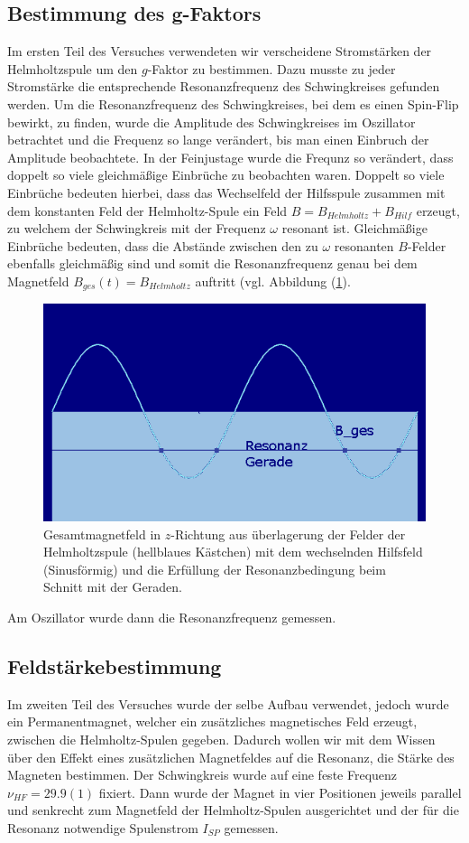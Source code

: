 \documentclass[a4paper,10pt]{scrartcl} %
\begin{document}
\subsection{Bestimmung des g-Faktors}
\label{subsec:g-Faktor}
Im ersten Teil des Versuches verwendeten wir verscheidene Stromstärken der Helmholtzspule um den $g$-Faktor zu bestimmen. Dazu musste zu jeder Stromstärke die entsprechende Resonanzfrequenz des Schwingkreises gefunden werden. Um die Resonanzfrequenz des Schwingkreises, bei dem es einen Spin-Flip bewirkt, zu finden, wurde die Amplitude des Schwingkreises im Oszillator betrachtet und die Frequenz so lange verändert, bis man einen Einbruch der Amplitude beobachtete. In der Feinjustage wurde die Frequnz so verändert, dass doppelt so viele gleichmä\ss ige Einbrüche zu beobachten waren. Doppelt so viele Einbrüche bedeuten hierbei, dass das Wechselfeld der Hilfsspule zusammen mit dem konstanten Feld der Helmholtz-Spule ein Feld $B = B_{Helmholtz} + B_{Hilf}$ erzeugt, zu welchem der Schwingkreis mit der Frequenz $\omega$ resonant ist. Gleichmä\ss ige Einbrüche bedeuten, dass die Abstände zwischen den zu $\omega$ resonanten $B$-Felder ebenfalls gleichmä\ss ig sind und somit die Resonanzfrequenz genau bei dem Magnetfeld $B_{ges}(t) = B_{Helmholtz}$ auftritt (vgl. Abbildung (\ref{fig:Resonanz}).
\begin{figure}
\label{fig:Resonanz}
\includegraphics[width=\textwidth]{Bilder/sinus.png}
\caption{Gesamtmagnetfeld in $z$-Richtung aus überlagerung der Felder der Helmholtzspule (hellblaues Kästchen) mit dem wechselnden Hilfsfeld (Sinusförmig) und die Erfüllung der Resonanzbedingung beim Schnitt mit der Geraden.}
\end{figure}
Am Oszillator wurde dann die Resonanzfrequenz gemessen.
\subsection{Feldstärkebestimmung}
\label{subsec:Feldstaerkebestimmung}
Im zweiten Teil des Versuches wurde der selbe Aufbau verwendet, jedoch wurde ein Permanentmagnet, welcher ein zusätzliches magnetisches Feld erzeugt, zwischen die Helmholtz-Spulen gegeben. Dadurch wollen wir mit dem Wissen über den Effekt eines zusätzlichen Magnetfeldes auf die Resonanz, die Stärke des Magneten bestimmen. Der Schwingkreis wurde auf eine feste Frequenz $\nu _{HF} = 29.9(1)$ fixiert. Dann wurde der Magnet in vier Positionen jeweils parallel und senkrecht zum Magnetfeld der Helmholtz-Spulen ausgerichtet und der für die Resonanz notwendige Spulenstrom $I_{SP}$ gemessen.
\end{document}
